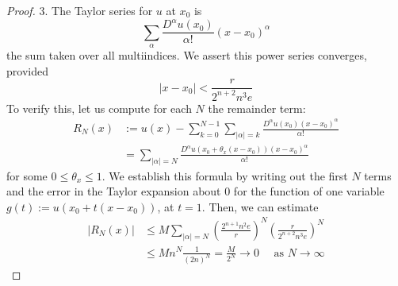 \begin{theorem}[Analyticity]
\begin{proof}
        3. The Taylor series for $u$ at $x_0$ is
        \begin{equation*}
            \sum_\alpha \frac{D^\alpha u\left(x_0\right)}{\alpha!}\left(x-x_0\right)^\alpha
        \end{equation*}
        the sum taken over all multiindices. We assert this power series converges, provided
        \begin{equation*}
            \left|x-x_0\right|<\frac{r}{2^{n+2} n^3 e}
        \end{equation*}
        To verify this, let us compute for each $N$ the remainder term:
        \begin{equation*}
            \begin{aligned}
                R_N(x) & :=u(x)-\sum_{k=0}^{N-1} \sum_{|\alpha|=k} \frac{D^\alpha u\left(x_0\right)\left(x-x_0\right)^\alpha}{\alpha!}       \\
                       & =\sum_{|\alpha|=N} \frac{D^\alpha u\left(x_0+ \theta_x \left(x-x_0\right)\right)\left(x-x_0\right)^\alpha}{\alpha!}
            \end{aligned}
        \end{equation*}
        for some $0 \leq \theta_x  \leq 1$. We establish this formula by writing out the first $N$ terms and the error in the Taylor expansion about 0 for the function of one variable $g(t):=u\left(x_0+t\left(x-x_0\right)\right)$, at $t=1$. Then, we can estimate
        \begin{equation*}
            \begin{aligned}
                \left|R_N(x)\right| & \leq M \sum_{|\alpha|=N}\left(\frac{2^{n+1} n^2 e}{r}\right)^N\left(\frac{r}{2^{n+2} n^3 e}\right)^N \\
                                    & \leq M n^N \frac{1}{(2 n)^N}=\frac{M}{2^N} \rightarrow 0 \quad \text { as } N \rightarrow \infty
            \end{aligned}
        \end{equation*}
    \end{proof}
\end{theorem}
